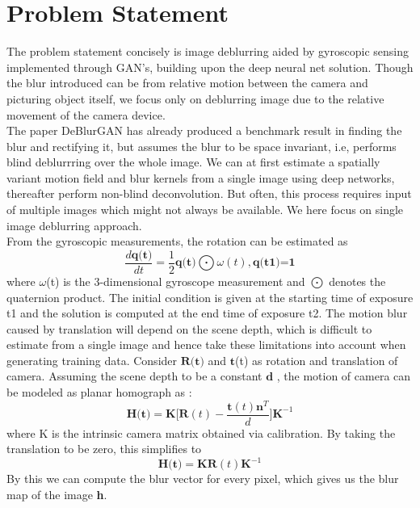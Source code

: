 \documentclass[10pt,twocolumn,letterpaper]{article}
\begin{document}
\section{Problem Statement}
\label{sec:problem}
The problem statement concisely is image deblurring aided by gyroscopic sensing implemented through GAN's, building upon the deep neural net solution. Though the blur introduced can be from relative motion between the camera and picturing object itself, we focus only on deblurring image due to the relative movement of the camera device.\\
The paper DeBlurGAN has already produced a benchmark result in finding the blur and rectifying it, but assumes the blur to be space invariant, i.e, performs blind deblurrring over the whole image. We can at first estimate a spatially variant motion field and blur kernels from a single image using deep networks, thereafter perform non-blind deconvolution. But often, this process requires input of multiple images which might not always be available. We here focus on single image deblurring approach. \\

From the gyroscopic measurements, the rotation can be estimated as
\begin{equation}
    \frac{d \textbf{q(t)}}{dt} = \frac{1}{2}\textbf{q(t)} \bigodot \omega(t), \textbf{q(t1)=1}
\end{equation}
where $\omega$(t) is the 3-dimensional gyroscope measurement and $\bigodot$ denotes the quaternion product. The initial condition is given at the starting time of exposure t1 and the solution is computed at the end time of exposure t2.
The motion blur caused by translation will depend on the scene depth, which is difficult to estimate from a single image and hence take these limitations into account when generating training data. Consider $\textbf{R(t)}$ and $\textbf{t}$(t) as rotation and translation of camera. Assuming the scene depth to be a constant $\textbf{d}$ , the motion of camera can be modeled as planar homograph as :
\begin{equation}
    \textbf{H(t)} = \textbf{K[R}(t) - \frac{\textbf{t}(t)\textbf{n}^{T}}{d}\textbf{]K}^{-1}
\end{equation}
where K is the intrinsic camera matrix obtained via calibration. By taking the translation to be zero, this simplifies to 
\begin{equation}
    \textbf{H(t)} = \textbf{KR}(t)\textbf{K}^{-1}
\end{equation}
By this we can compute the blur vector for every pixel, which gives us the blur map of the image \textbf{h}.
\end{document}
